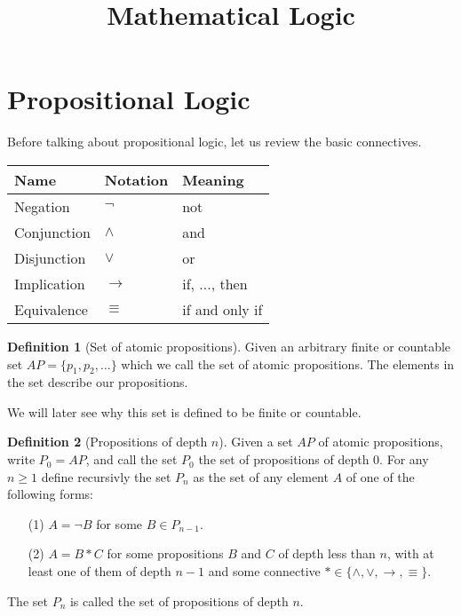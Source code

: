 \documentclass[11pt,a4paper]{article}
\title{\textbf{Mathematical Logic}}
\author{}
\date{}
\theoremstyle{definition}
\newtheorem{definition}{Definition}[section]
\theoremstyle{plain}
\renewcommand{\implies}{\rightarrow}
\begin{document}
	\maketitle
	\newpage
  \section{Propositional Logic}
  Before talking about propositional logic, let us review the basic
  connectives.

  \begin{center}
    \begin{tabular}{|l|l|l|}
      \hline
      Name        & Notation   & Meaning        \\ \hline
      Negation    & $\neg$     & not            \\ \hline
      Conjunction & $\land$    & and            \\ \hline
      Disjunction & $\lor$     & or             \\ \hline
      Implication & $\implies$ & if, ..., then  \\ \hline
      Equivalence & $\equiv$   & if and only if \\ \hline
    \end{tabular}
  \end{center}

  \begin{definition}[Set of atomic propositions]
    Given an arbitrary finite or countable set $AP = \{p_1,p_2,\dots\}$
    which we call the set of atomic propositions.
    The elements in the set describe our propositions.
  \end{definition}
  
  We will later see why this set is defined to be finite or countable.

  \begin{definition}[Propositions of depth $n$]
    Given a set $AP$ of atomic propositions, write $P_0 = AP$, and call
    the set $P_0$ the set of propositions of depth $0$.
    For any $n \geq 1$ define recursivly the set $P_n$ as the
    set of any element $A$ of one of the following forms:
    \begin{enumerate}
      \item[(1)] $A = \neg B$ for some $B \in P_{n-1}$.
      \item[(2)] $A = B * C$ for some propositions $B$ and $C$ of depth
        less than $n$, with at least one of them of depth $n-1$ and
        some connective $* \in \{\land, \lor, \implies, \equiv\}$.
    \end{enumerate}
    The set $P_n$ is called the set of propositions of depth $n$.
  \end{definition}
\end{document}
